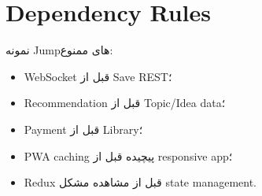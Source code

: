 \section{Dependency Rules}

\begin{warningbox}
نمونه Jumpهای ممنوع:
\begin{itemize}
  \item WebSocket قبل از Save REST؛
  \item Recommendation قبل از Topic/Idea data؛
  \item Payment قبل از Library؛
  \item PWA caching پیچیده قبل از responsive app؛
  \item Redux قبل از مشاهده مشکل state management.
\end{itemize}
\end{warningbox}

